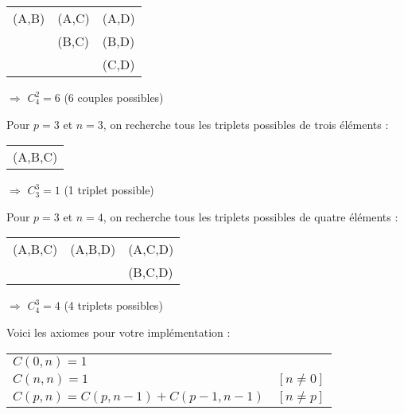 \documentclass[11pt,a4paper]{article}
\begin{document}
\begin{table}[!ht]
  \centering
  \begin{tabular}{l l l}
(A,B) & (A,C) & (A,D) \\
      & (B,C) & (B,D) \\
      &       & (C,D)
  \end{tabular}
\end{table}

\hspace*{3cm} $\Rightarrow$ $ C^{2}_{4} = 6 $ \hspace*{1cm} (6 couples possibles)

\bigskip

Pour $ p = 3 $ et $ n = 3 $, on recherche tous les triplets possibles de trois éléments :

\begin{table}[!ht]
  \centering
  \begin{tabular}{l}
(A,B,C) \\
  \end{tabular}
\end{table}

\hspace*{3cm} $\Rightarrow$ $ C^{3}_{3} = 1 $ \hspace*{1cm} (1 triplet possible)

\bigskip

Pour $ p = 3 $ et $ n = 4 $, on recherche tous les triplets possibles de quatre éléments :

\begin{table}[!ht]
  \centering
  \begin{tabular}{l l l}
(A,B,C) & (A,B,D) & (A,C,D) \\
        &         & (B,C,D) \\
  \end{tabular}
\end{table}

\hspace*{3cm} $\Rightarrow$ $ C^{3}_{4} = 4 $ \hspace*{1cm} (4 triplets possibles)

\bigskip

Voici les axiomes pour votre implémentation :

\begin{table}[!ht]
  \centering
  \begin{tabular}{l l}
$ C(0,n) = 1 $                             & \\
$ C(n,n) = 1 $                             & $ [n \neq 0] $ \\
$ C(p,n) = C(p, n - 1) + C(p - 1, n - 1) $ & $ [n \neq p] $ \\
  \end{tabular}
\end{table}
\end{document}
